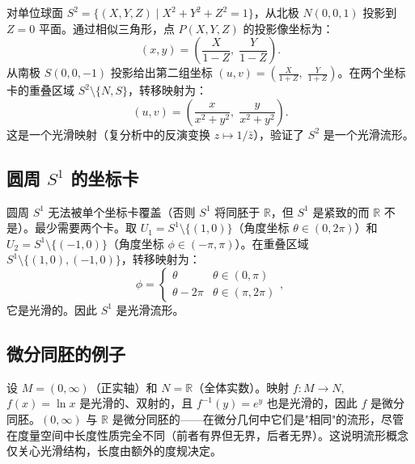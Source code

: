 对单位球面 $S^2 = \{(X,Y,Z) \mid X^2+Y^2+Z^2=1\}$，从北极 $N(0,0,1)$ 投影到 $Z=0$ 平面。通过相似三角形，点 $P(X,Y,Z)$ 的投影像坐标为：
\begin{equation}
    (x,y) = \left(\frac{X}{1-Z},\; \frac{Y}{1-Z}\right).
\end{equation}
从南极 $S(0,0,-1)$ 投影给出第二组坐标 $(u,v) = \left(\frac{X}{1+Z},\; \frac{Y}{1+Z}\right)$。在两个坐标卡的重叠区域 $S^2 \setminus \{N,S\}$，转移映射为：
\begin{equation}
    (u,v) = \left(\frac{x}{x^2+y^2},\; \frac{y}{x^2+y^2}\right).
\end{equation}
这是一个光滑映射（复分析中的反演变换 $z \mapsto 1/\bar{z}$），验证了 $S^2$ 是一个光滑流形。

\subsection{圆周 $S^1$ 的坐标卡}

圆周 $S^1$ 无法被单个坐标卡覆盖（否则 $S^1$ 将同胚于 $\mathbb{R}$，但 $S^1$ 是紧致的而 $\mathbb{R}$ 不是）。最少需要两个卡。取 $U_1 = S^1 \setminus \{(1,0)\}$（角度坐标 $\theta \in (0,2\pi)$）和 $U_2 = S^1 \setminus \{(-1,0)\}$（角度坐标 $\phi \in (-\pi,\pi)$）。在重叠区域 $S^1 \setminus \{(1,0),(-1,0)\}$，转移映射为：
\begin{equation}
    \phi = \begin{cases} \theta & \theta \in (0,\pi) \\ \theta - 2\pi & \theta \in (\pi,2\pi) \end{cases},
\end{equation}
它是光滑的。因此 $S^1$ 是光滑流形。

\subsection{微分同胚的例子}

设 $M = (0,\infty)$（正实轴）和 $N = \mathbb{R}$（全体实数）。映射 $f: M \to N$, $f(x) = \ln x$ 是光滑的、双射的，且 $f^{-1}(y) = e^y$ 也是光滑的，因此 $f$ 是微分同胚。$(0,\infty)$ 与 $\mathbb{R}$ 是微分同胚的——在微分几何中它们是"相同"的流形，尽管在度量空间中长度性质完全不同（前者有界但无界，后者无界）。这说明流形概念仅关心光滑结构，长度由额外的度规决定。

